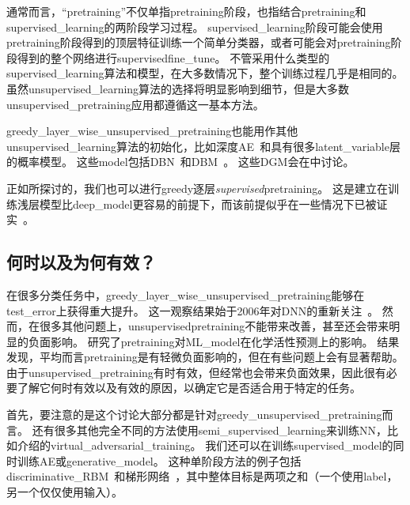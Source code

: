 
通常而言，``\gls{pretraining}''不仅单指\gls{pretraining}阶段，也指结合\gls{pretraining}和\gls{supervised_learning}的两阶段学习过程。
\gls{supervised_learning}阶段可能会使用\gls{pretraining}阶段得到的顶层特征训练一个简单分类器，或者可能会对\gls{pretraining}阶段得到的整个网络进行\gls{supervised}\gls{fine_tune}。
不管采用什么类型的\gls{supervised_learning}算法和模型，在大多数情况下，整个训练过程几乎是相同的。
虽然\gls{unsupervised_learning}算法的选择将明显影响到细节，但是大多数\gls{unsupervised_pretraining}应用都遵循这一基本方法。


\gls{greedy_layer_wise_unsupervised_pretraining}也能用作其他\gls{unsupervised_learning}算法的初始化，比如深度\gls{AE}~\citep{Hinton-Science2006}和具有很多\gls{latent_variable}层的概率模型。
这些\gls{model}包括\gls{DBN}~\citep{Hinton06-small}和\gls{DBM}~\citep{Salakhutdinov+Hinton-2009-small}。
这些\gls{DGM}会在中讨论。


正如所探讨的，我们也可以进行\gls{greedy}逐层\emph{\gls{supervised}}\gls{pretraining}。
这是建立在训练浅层模型比\gls{deep_model}更容易的前提下，而该前提似乎在一些情况下已被证实~\citep{Erhan+al-2010-small}。


\subsection{何时以及为何有效？}
\label{sec:when_and_why_does_unsupervised_pretraining_work}


在很多分类任务中，\gls{greedy_layer_wise_unsupervised_pretraining}能够在\gls{test_error}上获得重大提升。
这一观察结果始于2006年对\gls{DNN}的重新关注~\citep{Hinton06-small,Bengio-NIPS2007,ranzato-07-small}。
然而，在很多其他问题上，\gls{unsupervised}\gls{pretraining}不能带来改善，甚至还会带来明显的负面影响。
\cite{Ma-et-al-2015}研究了\gls{pretraining}对\gls{ML_model}在化学活性预测上的影响。
结果发现，平均而言\gls{pretraining}是有轻微负面影响的，但在有些问题上会有显著帮助。
由于\gls{unsupervised_pretraining}有时有效，但经常也会带来负面效果，因此很有必要了解它何时有效以及有效的原因，以确定它是否适合用于特定的任务。



首先，要注意的是这个讨论大部分都是针对\gls{greedy_unsupervised_pretraining}而言。
还有很多其他完全不同的方法使用\gls{semi_supervised_learning}来训练\gls{NN}，比如介绍的\gls{virtual_adversarial_training}。
我们还可以在训练\gls{supervised_model}的同时训练\gls{AE}或\gls{generative_model}。
这种单阶段方法的例子包括\gls{discriminative_RBM}~\citep{Larochelle+Bengio-2008}和梯形网络~\citep{Rasmus-et-al-arxiv2015}，其中整体目标是两项之和（一个使用\gls{label}，另一个仅仅使用输入）。

